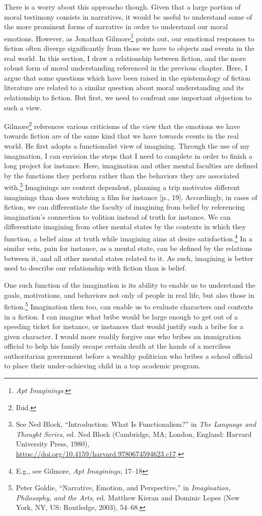 \documentclass[phdthesis,12pt,final]{wuthesis}
\theoremstyle{definition}
\theoremstyle{definition}
\theoremstyle{definition}
\theoremstyle{definition}
\theoremstyle{remark}
\begin{document}
There is a worry about this approacho though. Given that a large portion of moral testimony consists in narratives, it would be useful to understand some of the more prominent forms of narrative in order to understand our moral emotions. However, as Jonathan Gilmore\footnote{\emph{Apt {Imaginings}}.} points out, our emotional responses to fiction often diverge significantly from those we have to objects and events in the real world. In this section, I draw a relationship between fiction, and the more robust form of moral understanding referenced in the previous chapter. Here, I argue that some questions which have been raised in the epistemology of fiction literature are related to a similar question about moral understanding and its relationship to fiction. But first, we need to confront one important objection to such a view.

Gilmore\footnote{Ibid.} references various criticisms of the view that the emotions we have towards fiction are of the same kind that we have towards events in the real world. He first adopts a functionalist view of imagining. Through the use of my imagination, I can envision the steps that I need to complete in order to finish a long project for instance. Here, imagination and other mental faculties are defined by the functions they perform rather than the behaviors they are associated with.\footnote{See Ned Block, {``Introduction: What Is Functionalism?''} in \emph{The {Language} and {Thought Series}}, ed. Ned Block (Cambridge, MA; London, England: Harvard University Press, 1980), \url{https://doi.org/10.4159/harvard.9780674594623.c17}.} Imaginings are context dependent, planning a trip motivates different imaginings than does watching a film for instance {[}p., 19{]}. Accordingly, in cases of fiction, we can differentiate the faculty of imagining from belief by referencing imagination's connection to volition instead of truth for instance. We can differentiate imagining from other mental states by the contexts in which they function, a belief aims at truth while imagining aims at desire satisfaction.\footnote{E.g., see Gilmore, \emph{Apt {Imaginings}}, 17--18} In a similar vein, pain for instance, as a mental state, can be defined by the relations between it, and all other mental states related to it. As such, imagining is better used to describe our relationship with fiction than is belief.

One such function of the imagination is its ability to enable us to understand the goals, motivations, and behaviors not only of people in real life, but also those in fiction.\footnote{Peter Goldie, {``Narrative, Emotion, and Perspective,''} in \emph{Imagination, {Philosophy}, and the {Arts}}, ed. Matthew Kieran and Dominic Lopes (New York, NY, US: Routledge, 2003), 54--68.} Imagination then too, can enable us to evaluate characters and contexts in a fiction. I can imagine what bribe would be large enough to get out of a speeding ticket for instance, or instances that would justify such a bribe for a given character. I would more readily forgive one who bribes an immigration official to help his family escape certain death at the hands of a merciless authoritarian government before a wealthy politician who bribes a school official to place their under-achieving child in a top academic program.
\end{document}

